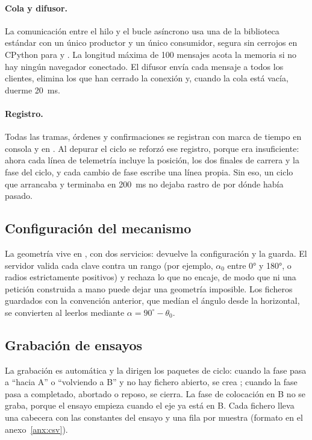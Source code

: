 \paragraph{Cola y difusor.} La comunicación entre el hilo y el bucle asíncrono usa una 
de la biblioteca estándar con un único productor y un único consumidor, segura sin cerrojos en
CPython para  y . La longitud máxima de 100 mensajes acota la memoria
si no hay ningún navegador conectado. El difusor envía cada mensaje a todos los clientes, elimina
los que han cerrado la conexión y, cuando la cola está vacía, duerme \SI{20}{\milli\second}.

\paragraph{Registro.} Todas las tramas, órdenes y confirmaciones se registran con marca de tiempo en
consola y en . Al depurar el ciclo se reforzó ese registro, porque era
insuficiente: ahora cada línea de telemetría incluye la posición, los dos finales de carrera y la
fase del ciclo, y cada cambio de fase escribe una línea propia. Sin eso, un ciclo que arrancaba y
terminaba en \SI{200}{\milli\second} no dejaba rastro de por dónde había pasado.

\subsection{Configuración del mecanismo}

La geometría vive en , con dos servicios: 
devuelve la configuración y  la guarda. El servidor valida cada clave
contra un rango (por ejemplo, $\alpha_0$ entre 0° y 180°, o radios estrictamente positivos) y
rechaza lo que no encaje, de modo que ni una petición construida a mano puede dejar una geometría
imposible. Los ficheros guardados con la convención anterior, que medían el ángulo desde la
horizontal, se convierten al leerlos mediante $\alpha = 90^\circ - \theta_0$.

\subsection{Grabación de ensayos}

La grabación es automática y la dirigen los paquetes de ciclo: cuando la fase pasa a ``hacia A'' o
``volviendo a B'' y no hay fichero abierto, se crea
; cuando la fase pasa a completado, abortado o reposo, se
cierra. La fase de colocación en B no se graba, porque el ensayo empieza cuando el eje ya está en B.
Cada fichero lleva una cabecera con las constantes del ensayo y una fila por muestra (formato en el
anexo~\ref{anx:csv}).

